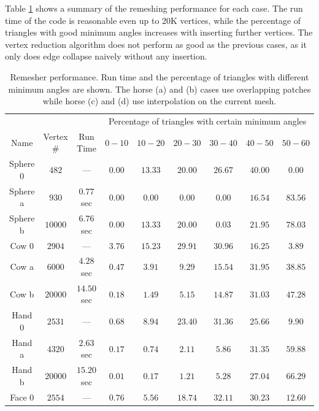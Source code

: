 \documentclass[letter,11pt]{article}
\begin{document}
Table \ref{tab:perf} shows a summary of the remeshing performance for
each case. The run time of the code is reasonable even up to 20K
vertices, while the percentage of triangles with good minimum angles
increases with inserting further vertices. The vertex reduction
algorithm does not perform as good as the previous cases, as it
only does edge collapse naively without any insertion.
\begin{table}
  \center
  \caption{Remesher performance. Run time and the percentage of triangles with
    different minimum angles are shown. The horse (a) and (b) cases use
    overlapping patches while horse (c) and (d) use interpolation on the
    current mesh.}
  \label{tab:perf}
  \begin{tabular}{*9c}
    \hline
    &&&
    \multicolumn{6}{c}{Percentage of triangles with certain minimum angles} \\
    Name &Vertex \# &Run Time
    &$0-10$ &$10-20$ &$20-30$ &$30-40$ &$40-50$ &$50-60$ \\
    \hline
    Sphere 0 &$482$ &---
    &$0.00$ &$13.33$ &$20.00$ &$26.67$ &$40.00$ &$0.00$ \\
    Sphere a &$930$ &$0.77$ sec
    &$0.00$ &$0.00$ &$0.00$ &$0.00$ &$16.54$ &$83.56$ \\
    Sphere b &$10000$ &$6.76$ sec
    &$0.00$ &$13.33$ &$20.00$ &$0.03$ &$21.95$ &$78.03$ \\
    \hline
    Cow 0 &$2904$ &---
    &$3.76$ &$15.23$ &$29.91$ &$30.96$ &$16.25$ &$3.89$ \\
    Cow a &$6000$ &$4.28$ sec
    &$0.47$ &$3.91$ &$9.29$ &$15.54$ &$31.95$ &$38.85$ \\
    Cow b &$20000$ &$14.50$ sec
    &$0.18$ &$1.49$ &$5.15$ &$14.87$ &$31.03$ &$47.28$ \\
    \hline
    Hand 0 &$2531$ &---
    &$0.68$ &$8.94$ &$23.40$ &$31.36$ &$25.66$ &$9.90$ \\
    Hand a &$4320$ &$2.63$ sec
    &$0.17$ &$0.74$ &$2.11$ &$5.86$ &$31.35$ &$59.88$ \\
    Hand b &$20000$ &$15.20$ sec
    &$0.01$ &$0.17$ &$1.21$ &$5.28$ &$27.04$ &$66.29$ \\
    \hline
    Face 0 &$2554$ &---
    &$0.76$ &$5.56$ &$18.74$ &$32.11$ &$30.23$ &$12.60$ \\

\end{tabular}
\end{table}
\end{document}
